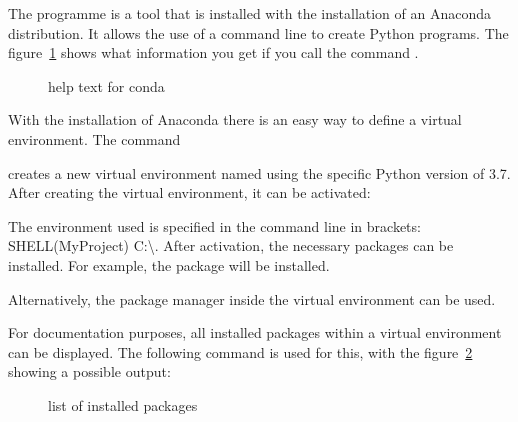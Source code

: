 The programme  is a tool that is installed with the installation of an Anaconda distribution. It allows the use of a command line to create Python programs. The figure~\ref{env:conda} shows what information you get if you call the command .

\bigskip

\begin{figure}
    
    \caption{help text for conda}
    
    \label{env:conda}  
\end{figure}

\bigskip

With the installation of Anaconda there is an easy way to define a virtual environment. The command



creates a new virtual environment named  using the specific Python version of 3.7. After creating the virtual environment, it can be activated:

\medskip


\medskip

The environment used is specified in the command line in brackets: SHELL{(MyProject) C:\textbackslash}. After activation, the necessary packages can be installed.  For example, the package  will be installed.

\medskip


\medskip

Alternatively, the package manager inside the virtual environment can be used.

\medskip


\medskip

For documentation purposes, all installed packages within a virtual environment can be displayed. The following command is used for this, with the figure~\ref{env:list} showing a possible output:

\medskip


\medskip


\begin{figure}
    
    \caption{list of installed packages}
    
    \label{env:list}  
\end{figure}

